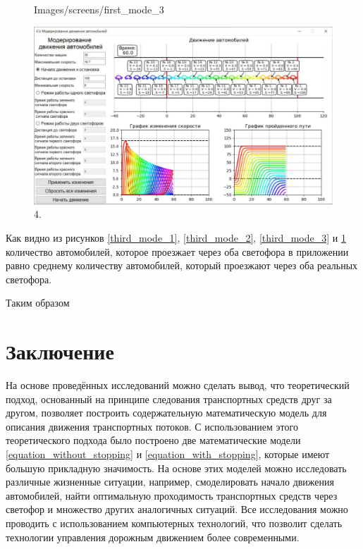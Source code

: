 \documentclass[12pt, a4paper]{extarticle}
\numberwithin{equation}{section}
\numberwithin{figure}{section}
\begin{document}
\begin{figure}[h!]
\begin{center}
\begin{minipage}[h]{0.48\linewidth}
			{Images/screens/first_mode_3}
			\caption{3.}
			\label{third_mode_3}
		\end{minipage}
		\hfill 
		\begin{minipage}[h]{0.48\linewidth}
			\includegraphics[width=1\linewidth]
			{Images/screens/first_mode_4}
			\caption{4.}
			\label{third_mode_4}
		\end{minipage}
	\end{center}
\end{figure}

Как видно из рисунков \ref{third_mode_1}, \ref{third_mode_2}, \ref{third_mode_3} и \ref{third_mode_4} количество автомобилей, которое проезжает через оба светофора в приложении равно среднему количеству автомобилей, который проезжают через оба реальных светофора.

Таким образом 

\newpage
\section*{Заключение}
На основе проведённых исследований можно сделать вывод, что теоретический подход, основанный на принципе следования транспортных средств друг за другом, позволяет построить содержательную математическую модель для описания движения транспортных потоков. С использованием этого теоретического подхода было построено две математические модели  \eqref{equation_without_stopping} и \eqref{equation_with_stopping}, которые имеют большую прикладную значимость. На основе этих моделей можно исследовать различные жизненные ситуации, например, смоделировать начало движения автомобилей, найти оптимальную проходимость транспортных средств через светофор и множество других аналогичных ситуаций. Все исследования можно проводить с использованием компьютерных технологий, что позволит сделать технологии управления дорожным движением более современными.
\end{document}
